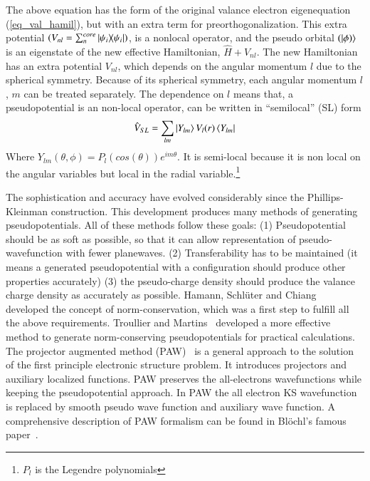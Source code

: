 The above equation has the form of the original valance electron eigenequation (\ref{eq_val_hamil}), but with an extra term for preorthogonalization. This extra potential $(V_{nl} = \sum_n^{core} \dyad{\psi_i}{\psi_i})$, is a nonlocal operator, and the pseudo orbital $(\ket{\phi)}$ is an eigenstate of the new effective Hamiltonian, $\hat{H} + V_{nl}$. The new Hamiltonian has an extra potential $V_{nl}$, which depends on the angular momentum $l$ due to the spherical symmetry. Because of its spherical symmetry, each angular momentum $l$, $m$ can be treated separately. The dependence on $l$ means that, a pseudopotential is an non-local operator, can be written in ``semilocal'' (SL) form
\begin{equation}
\label{eq_sl}
\hat{V}_{SL} = \sum_{lm} \ket{Y_{lm}}V_l(r)\bra{Y_{lm}}
\end{equation}
Where $Y_{lm}(\theta,\phi) = P_l(cos(\theta))e^{im\theta}$. It is semi-local because it is non local on the angular variables but local in the radial variable.\footnote{$P_l$ is the Legendre polynomials}


The sophistication and accuracy have evolved considerably since the Phillips-Kleinman construction. This development produces many methods of generating pseudopotentials. All of these methods follow these goals: (1) Pseudopotential should be as soft as possible, so that it can allow representation of pseudo-wavefunction with fewer planewaves. (2) Transferability has to be maintained (it means a generated pseudopotential with a configuration should produce other properties accurately) (3) the pseudo-charge density should produce the valance charge density as accurately as possible. Hamann, Schl\"uter and Chiang~\cite{hamann1979norm} developed the concept of norm-conservation, which was a first step to fulfill all the above requirements. Troullier and Martins~\cite{troullier1991efficient} developed a more effective method to generate norm-conserving pseudopotentials for practical calculations. The projector augmented method (PAW)~\cite{Bloechl1994,kresse1999ultrasoft} is a general approach to the solution of the first principle electronic structure problem. It introduces projectors and auxiliary localized functions. PAW preserves the all-electrons wavefunctions while keeping the pseudopotential approach. In PAW the all electron KS wavefunction is  replaced by smooth pseudo wave function and auxiliary wave function. A comprehensive description of PAW formalism can be found in Bl\"ochl's famous paper~\cite{Bloechl1994}.

